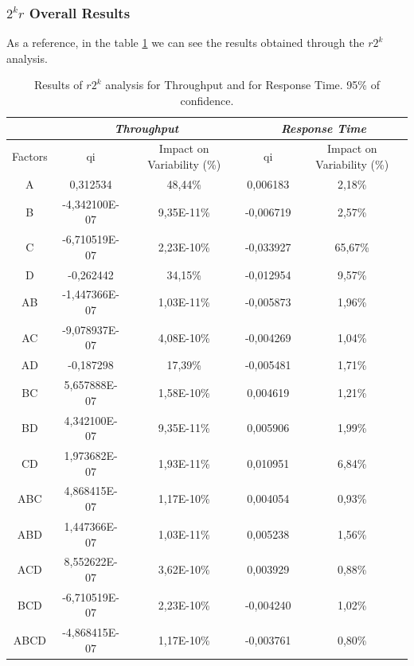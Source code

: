 \newpage
\subsubsection{$2^kr$ Overall Results}
As a reference, in the table \ref{tab: 2kr_results} we can see the results obtained through the $r2^k$ analysis.
\begin{table}[H]
	\centering
	\begin{tabular}{|c|c|c|c|c|}
		\hline
		\textbf{} & \multicolumn{2}{c|}{\textit{\textbf{Throughput}}} & \multicolumn{2}{c|}{\textit{\textbf{Response Time}}} \\ \hline
		Factors   & qi          & Impact on Variability (\%)          & qi            & Impact on Variability (\%)           \\ \hline
		A    & 0,312534      & 48,44\%    & 0,006183  & 2,18\%  \\ \hline
		B    & -4,342100E-07 & 9,35E-11\% & -0,006719 & 2,57\%  \\ \hline
		C    & -6,710519E-07 & 2,23E-10\% & -0,033927 & 65,67\% \\ \hline
		D    & -0,262442     & 34,15\%    & -0,012954 & 9,57\%  \\ \hline
		AB   & -1,447366E-07 & 1,03E-11\% & -0,005873 & 1,96\%  \\ \hline
		AC   & -9,078937E-07 & 4,08E-10\% & -0,004269 & 1,04\%  \\ \hline
		AD   & -0,187298     & 17,39\%    & -0,005481 & 1,71\%  \\ \hline
		BC   & 5,657888E-07  & 1,58E-10\% & 0,004619  & 1,21\%  \\ \hline
		BD   & 4,342100E-07  & 9,35E-11\% & 0,005906  & 1,99\%  \\ \hline
		CD   & 1,973682E-07  & 1,93E-11\% & 0,010951  & 6,84\%  \\ \hline
		ABC  & 4,868415E-07  & 1,17E-10\% & 0,004054  & 0,93\%  \\ \hline
		ABD  & 1,447366E-07  & 1,03E-11\% & 0,005238  & 1,56\%  \\ \hline
		ACD  & 8,552622E-07  & 3,62E-10\% & 0,003929  & 0,88\%  \\ \hline
		BCD  & -6,710519E-07 & 2,23E-10\% & -0,004240 & 1,02\%  \\ \hline
		ABCD & -4,868415E-07 & 1,17E-10\% & -0,003761 & 0,80\%  \\ \hline
	\end{tabular}
	\caption{Results of $r2^k$ analysis for Throughput and for Response Time. 95\% of confidence.}
	\label{tab: 2kr_results}
\end{table}
																
